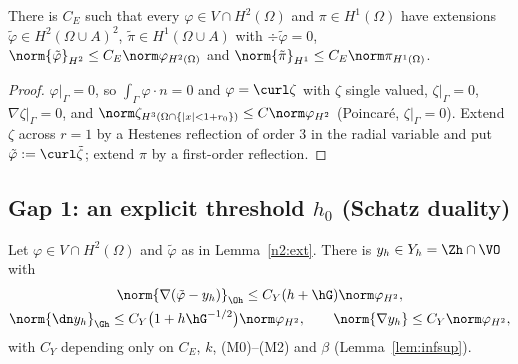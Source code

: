 \begin{lemma}\label{n2:ext}
There is $C_E$ such that every $\varphi\in V\cap H^2(\Omega)$ and $\pi\in H^1(\Omega)$ have extensions $\tilde\varphi\in H^2(\Omega\cup A)^2$,
$\tilde\pi\in H^1(\Omega\cup A)$ with $\div\tilde\varphi=0$, $\norm{\tilde\varphi}_{H^2}\le C_E\norm\varphi_{H^2(\Omega)}$ and
$\norm{\tilde\pi}_{H^1}\le C_E\norm\pi_{H^1(\Omega)}$.
\end{lemma}

\begin{proof}
$\varphi|_\Gamma=0$, so $\int_\Gamma\varphi\cdot n=0$ and $\varphi=\curl\zeta$ with $\zeta$ single valued, $\zeta|_\Gamma=0$, $\nabla\zeta|_\Gamma=0$, and
$\norm\zeta_{H^3(\Omega\cap\{|x|<1+r_0\})}\le C\norm\varphi_{H^2}$ (Poincar\'e, $\zeta|_\Gamma=0$). Extend $\zeta$ across $r=1$ by a Hestenes
reflection of order $3$ in the radial variable and put $\tilde\varphi:=\curl\tilde\zeta$; extend $\pi$ by a first-order reflection.
\end{proof}

\subsection{Gap 1: an explicit threshold $h_0$ (Schatz duality)}\label{n2:schatz}

\begin{lemma}\label{n2:Y}
Let $\varphi\in V\cap H^2(\Omega)$ and $\tilde\varphi$ as in Lemma~\ref{n2:ext}. There is $y_h\in Y_h=\Zh\cap\VO$ with
\begin{gather*}
\norm{\nabla(\tilde\varphi-y_h)}_{\Oh}\le C_Y(h+\hG)\norm\varphi_{H^2},\\
\norm{\dn y_h}_{\Gh}\le C_Y\bigl(1+h\hG^{-1/2}\bigr)\norm\varphi_{H^2},\qquad
\norm{\nabla y_h}\le C_Y\norm\varphi_{H^2},
\end{gather*}
with $C_Y$ depending only on $C_E$, $k$, (M0)--(M2) and $\beta$ (Lemma~\ref{lem:infsup}).
\end{lemma}

